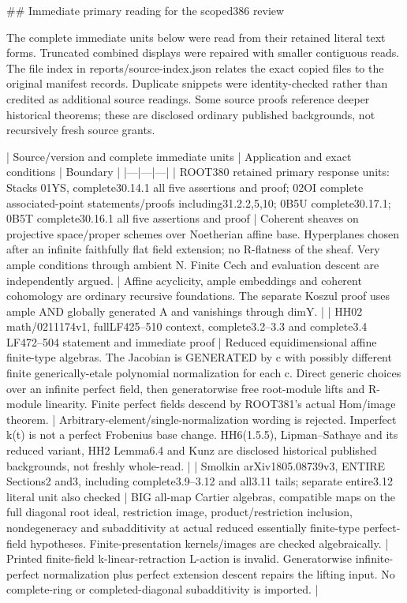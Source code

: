 \documentclass[11pt]{article}
\begin{document}
\begin{QualifiedData}
## Immediate primary reading for the scoped386 review

The complete immediate units below were read from their retained literal text forms. Truncated combined displays were repaired with smaller contiguous reads. The file index in reports/source-index.json relates the exact copied files to the original manifest records. Duplicate snippets were identity-checked rather than credited as additional source readings. Some source proofs reference deeper historical theorems; these are disclosed ordinary published backgrounds, not recursively fresh source grants.

| Source/version and complete immediate units | Application and exact conditions | Boundary |
|---|---|---|
| ROOT380 retained primary response units: Stacks 01YS, complete30.14.1 all five assertions and proof; 02OI complete associated-point statements/proofs including31.2.2,5,10; 0B5U complete30.17.1; 0B5T complete30.16.1 all five assertions and proof | Coherent sheaves on projective space/proper schemes over Noetherian affine base. Hyperplanes chosen after an infinite faithfully flat field extension; no R-flatness of the sheaf. Very ample conditions through ambient N. Finite Cech and evaluation descent are independently argued. | Affine acyclicity, ample embeddings and coherent cohomology are ordinary recursive foundations. The separate Koszul proof uses ample AND globally generated A and vanishings through dimY. |
| HH02 math/0211174v1, fullLF425--510 context, complete3.2--3.3 and complete3.4 LF472--504 statement and immediate proof | Reduced equidimensional affine finite-type algebras. The Jacobian is GENERATED by c with possibly different finite generically-etale polynomial normalization for each c. Direct generic choices over an infinite perfect field, then generatorwise free root-module lifts and R-module linearity. Finite perfect fields descend by ROOT381's actual Hom/image theorem. | Arbitrary-element/single-normalization wording is rejected. Imperfect k(t) is not a perfect Frobenius base change. HH6(1.5.5), Lipman--Sathaye and its reduced variant, HH2 Lemma6.4 and Kunz are disclosed historical published backgrounds, not freshly whole-read. |
| Smolkin arXiv1805.08739v3, ENTIRE Sections2 and3, including complete3.9--3.12 and all3.11 tails; separate entire3.12 literal unit also checked | BIG all-map Cartier algebras, compatible maps on the full diagonal root ideal, restriction image, product/restriction inclusion, nondegeneracy and subadditivity at actual reduced essentially finite-type perfect-field hypotheses. Finite-presentation kernels/images are checked algebraically. | Printed finite-field k-linear-retraction L-action is invalid. Generatorwise infinite-perfect normalization plus perfect extension descent repairs the lifting input. No complete-ring or completed-diagonal subadditivity is imported. |

\end{QualifiedData}
\end{document}
